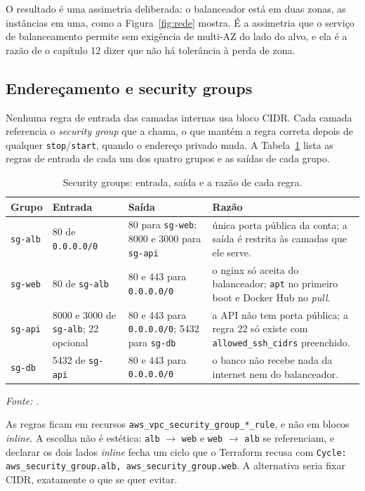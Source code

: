 \documentclass[11pt,a4paper]{article}
\begin{document}
O resultado é uma assimetria deliberada: o balanceador está em duas zonas, as instâncias em uma, como
a Figura~\ref{fig:rede} mostra. É a assimetria que o serviço de balanceamento permite sem exigência
de multi-AZ do lado do alvo, e ela é a razão de o capítulo 12 dizer que não há tolerância à perda de
zona.

\subsection{Endereçamento e security groups}

Nenhuma regra de entrada das camadas internas usa bloco CIDR. Cada camada referencia o
\emph{security group} que a chama, o que mantém a regra correta depois de qualquer
\texttt{stop}/\texttt{start}, quando o endereço privado muda. A Tabela~\ref{tab:sg} lista as regras de
entrada de cada um dos quatro grupos e as saídas de cada grupo.

\begin{table}[tb]
\caption{Security groups: entrada, saída e a razão de cada regra.}
\label{tab:sg}
\centering\small
\begin{tabularx}{\textwidth}{p{1.6cm}p{4.6cm}p{4.2cm}X}
\toprule
\textbf{Grupo} & \textbf{Entrada} & \textbf{Saída} & \textbf{Razão} \\
\midrule
\texttt{sg-alb} & 80 de \texttt{0.0.0.0/0} & 80 para \texttt{sg-web}; 8000 e 3000 para \texttt{sg-api} &
  única porta pública da conta; a saída é restrita às camadas que ele serve. \\
\texttt{sg-web} & 80 de \texttt{sg-alb} & 80 e 443 para \texttt{0.0.0.0/0} &
  o nginx só aceita do balanceador; \texttt{apt} no primeiro boot e Docker Hub no \emph{pull}. \\
\texttt{sg-api} & 8000 e 3000 de \texttt{sg-alb}; 22 opcional &
  80 e 443 para \texttt{0.0.0.0/0}; 5432 para \texttt{sg-db} & a API não tem porta pública; a regra 22 só existe com
  \texttt{allowed\_ssh\_cidrs} preenchido. \\
\texttt{sg-db} & 5432 de \texttt{sg-api} & 80 e 443 para \texttt{0.0.0.0/0} &
  o banco não recebe nada da internet nem do balanceador. \\
\bottomrule
\end{tabularx}
{\small\itshape Fonte: .}
\end{table}

As regras ficam em recursos \texttt{aws\_\allowbreak{}vpc\_\allowbreak{}security\_\allowbreak{}group\_\allowbreak{}*\_\allowbreak{}rule}, e não em blocos
\emph{inline}. A escolha não é estética: \texttt{alb} $\rightarrow$ \texttt{web} e
\texttt{web} $\rightarrow$ \texttt{alb} se referenciam, e declarar os dois lados \emph{inline} fecha
um ciclo que o Terraform recusa com \texttt{Cycle: aws\_\allowbreak{}security\_\allowbreak{}group.alb,
aws\_\allowbreak{}security\_\allowbreak{}group.web}. A alternativa seria fixar CIDR, exatamente o que se quer evitar.
\end{document}
